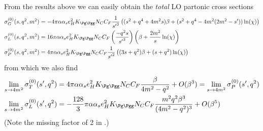 From the results above we can easily obtain the \textit{total} LO partonic cross sections
\begin{align}
\sigma_G^{(0)}(s,q^2,m^2) &=-4\pi\alpha\alpha_s e_H^2 K_{\Pg\Pgg}N_CC_F\frac 1 {{s'}^3}\left((s^2+q^4+4m^2 s)\beta + (s^2+q^4-4m^2(2m^2-s'))\ln(\chi)\right)\\
\sigma_L^{(0)}(s,q^2,m^2) &=16\pi\alpha\alpha_s e_H^2 K_{\Pg\Pgg}N_CC_F\left(\frac{-q^2s}{{s'}^3}\right)\left(\beta + \frac{2m^2}{s}\ln(\chi)\right)\\
\sigma_P^{(0)}(s,q^2,m^2) &=4\pi\alpha\alpha_s e_H^2 K_{\Pg\Pgg}N_CC_F\frac 1 {{s'}^2}\left((3s+q^2)\beta + (s+q^2)\ln(\chi)\right)
\end{align}
from which we also find
\begin{align}
\lim_{s\rightarrow 4m^2} \sigma_T^{(0)}(s',q^2) &= 4\pi\alpha\alpha_s e_H^2 K_{\Pg\Pgg}N_CC_F\frac{\beta}{4m^2-q^2} + O(\beta^3) = \lim_{s\rightarrow 4m^2} \sigma_P^{(0)}(s',q^2)\\
\lim_{s\rightarrow 4m^2} \sigma_L^{(0)}(s',q^2) &= -\frac{128}{3}\pi\alpha\alpha_s e_H^2 K_{\Pg\Pgg}N_CC_F\frac{m^2q^2\beta^3}{(4m^2-q^2)^3} + O(\beta^5)
\end{align}
(Note the missing factor of 2 in \cite[eq. (5.9)]{Laenen1993162}.)

